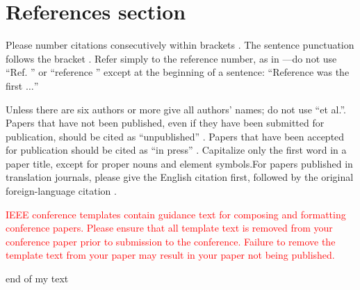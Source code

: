 \documentclass[conference]{IEEEtran}
\begin{document}
\section*{References section}

Please number citations consecutively within brackets \cite{b2}. The
sentence punctuation follows the bracket \cite{b1}. Refer simply to the reference
number, as in \cite{b3}---do not use ``Ref. \cite{b3}'' or ``reference \cite{b3}'' except at
the beginning of a sentence: ``Reference \cite{b3} was the first $\ldots$''

Unless there are six authors or more give all authors' names; do not use
``et al.''. Papers that have not been published, even if they have been
submitted for publication, should be cited as ``unpublished'' \cite{b4}. Papers
that have been accepted for publication should be cited as ``in press'' \cite{b5}.
Capitalize only the first word in a paper title, except for proper nouns and
element symbols.For papers published in translation journals, please give the English
citation first, followed by the original foreign-language citation \cite{b6}.



\vspace{12pt}
\textcolor{red}{IEEE conference templates contain guidance text for composing and formatting 
conference papers. Please ensure that all template text is removed from your 
conference paper prior to submission to the conference. Failure to remove the 
template text from your paper may result in your paper not being published.}

end of my text
\end{document}
